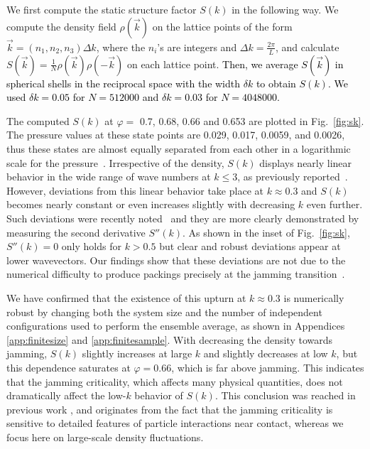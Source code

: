 \documentclass[aps,pre,twocolumn,superscriptaddress]{revtex4-1}
\renewcommand{\phi}{\varphi}
\newcommand{\red}[1]{\textcolor{black}{#1}}
\begin{document}
We first compute the static structure factor $S(k)$ in the following way. 
We compute the density field $\rho(\vec{k})$ on the lattice points
of the form 
$\vec{k} = (n_1, n_2, n_3)\Delta k$, where the $n_i$'s 
are integers and $\Delta k = \frac{2\pi}{L}$, 
and calculate $S(\vec{k}) = \frac{1}{N} \rho(\vec{k}) \rho(-\vec{k})$ 
on each lattice point. 
\red{Then, we average $S(\vec{k})$ in spherical shells in the reciprocal space with the width $\delta k$ to obtain $S(k)$. 
We used $\delta k = 0.05$ for $N=512000$ and $\delta k = 0.03$ for $N = 4048000$.}

The computed $S(k)$ at $\phi =$ 0.7, 0.68, 0.66 and 0.653 are 
plotted in Fig.~\ref{fig:sk}. 
The pressure values at 
these state points are 0.029, 0.017, 0.0059, and 0.0026, 
thus these states are almost equally separated from each other 
in a logarithmic scale for the 
pressure~\cite{ohern2003}. Irrespective of the density, 
$S(k)$ displays nearly linear behavior in the wide range of wave 
numbers at $k \leq 3$, as previously reported~\cite{donev2005,berthier2011}. 
However, deviations from this linear behavior take place at $k \approx 0.3$
and $S(k)$ becomes nearly constant or even increases slightly 
with decreasing $k$ even further. Such deviations were recently
noted~\cite{wu2015,ikeda2015,atkinson2016b} and they are more clearly
demonstrated by measuring the second derivative $S''(k)$. As
shown in the inset of Fig.~\ref{fig:sk}, $S''(k) = 0$ only holds
for $k > 0.5$ but clear and robust deviations appear at lower 
wavevectors. Our findings show that these deviations 
are not due to the numerical difficulty to produce 
packings precisely at the jamming transition~\cite{atkinson2016b}.

We have confirmed that the existence of this upturn 
at $k \approx 0.3$ is numerically robust 
by changing both the system size and the number of independent configurations
used to perform the ensemble average, as shown in Appendices 
\ref{app:finitesize} and \ref{app:finitesample}.
With decreasing the density towards jamming, 
$S(k)$ slightly increases at large $k$ and slightly decreases at low $k$, 
but this dependence saturates at $\varphi = 0.66$, which is far above jamming.  
This indicates that the jamming criticality, which affects 
many physical quantities, does not dramatically affect 
the low-$k$ behavior of $S(k)$. This conclusion 
was reached in previous work \cite{wu2015,ikeda2015}, and 
originates from the fact 
that the jamming criticality is sensitive to detailed 
features of particle interactions near contact, whereas 
we focus here on large-scale density fluctuations. 
\end{document}
